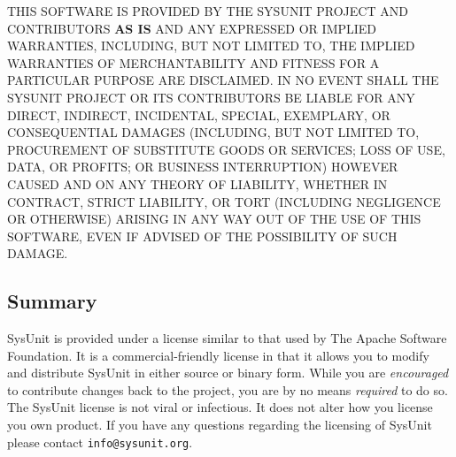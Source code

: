 THIS SOFTWARE IS PROVIDED BY THE SYSUNIT PROJECT AND CONTRIBUTORS
\textbf{AS IS} AND ANY EXPRESSED OR IMPLIED WARRANTIES, INCLUDING, BUT
NOT LIMITED TO, THE IMPLIED WARRANTIES OF MERCHANTABILITY AND
FITNESS FOR A PARTICULAR PURPOSE ARE DISCLAIMED.  IN NO EVENT SHALL
THE SYSUNIT PROJECT OR ITS CONTRIBUTORS BE LIABLE FOR ANY DIRECT,
INDIRECT, INCIDENTAL, SPECIAL, EXEMPLARY, OR CONSEQUENTIAL DAMAGES
(INCLUDING, BUT NOT LIMITED TO, PROCUREMENT OF SUBSTITUTE GOODS OR
SERVICES; LOSS OF USE, DATA, OR PROFITS; OR BUSINESS INTERRUPTION)
HOWEVER CAUSED AND ON ANY THEORY OF LIABILITY, WHETHER IN CONTRACT,
STRICT LIABILITY, OR TORT (INCLUDING NEGLIGENCE OR OTHERWISE)
ARISING IN ANY WAY OUT OF THE USE OF THIS SOFTWARE, EVEN IF ADVISED
OF THE POSSIBILITY OF SUCH DAMAGE.

\normalsize

\subsection{Summary}

SysUnit is provided under a license similar to that used by
The Apache Software Foundation.  It is a commercial-friendly license
in that it allows you to modify and distribute SysUnit in either
source or binary form.  While you are \emph{encouraged} to contribute
changes back to the project, you are by no means \emph{required} to
do so.   The SysUnit license is not viral or infectious.  It
does not alter how you license you own product.  If you have any
questions regarding the licensing of SysUnit please contact
\verb|info@sysunit.org|.
